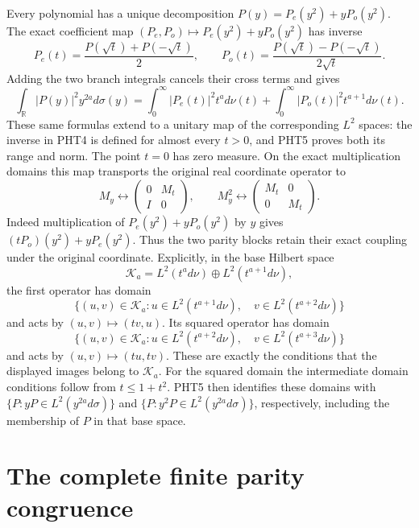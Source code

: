 \documentclass[11pt,a4paper]{article}
\begin{document}
Every polynomial has a unique decomposition
$P(y)=P_e(y^2)+yP_o(y^2)$. The exact coefficient map
$(P_e,P_o)\mapsto P_e(y^2)+yP_o(y^2)$ has inverse
\[
 P_e(t)=\frac{P(\sqrt t)+P(-\sqrt t)}2,
 \qquad
 P_o(t)=\frac{P(\sqrt t)-P(-\sqrt t)}{2\sqrt t}.
\tag{PHT4}
\]
Adding the two branch integrals cancels their cross terms and gives
\[
 \int_{\mathbb R}|P(y)|^2y^{2a}d\sigma(y)
 =\int_0^\infty|P_e(t)|^2t^a d\nu(t)
  +\int_0^\infty|P_o(t)|^2t^{a+1}d\nu(t).
\tag{PHT5}
\]
These same formulas extend to a unitary map of the corresponding
$L^2$ spaces: the inverse in PHT4 is defined for almost every
$t>0$, and PHT5 proves both its range and norm. The point $t=0$
has zero measure. On the exact multiplication domains this map
transports the original real coordinate operator to
\[
 M_y\longleftrightarrow
 \begin{pmatrix}0&M_t\\I&0\end{pmatrix},
 \qquad
 M_y^2\longleftrightarrow
 \begin{pmatrix}M_t&0\\0&M_t\end{pmatrix}.
\tag{PHT6}
\]
Indeed multiplication of $P_e(y^2)+yP_o(y^2)$ by $y$ gives
$(tP_o)(y^2)+yP_e(y^2)$. Thus the two parity blocks retain
their exact coupling under the original coordinate.
Explicitly, in the base Hilbert space
\[
 \mathcal K_a=L^2(t^a d\nu)\oplus L^2(t^{a+1}d\nu),
\]
the first operator has domain
\[
 \{(u,v)\in\mathcal K_a:
       u\in L^2(t^{a+1}d\nu),\quad
       v\in L^2(t^{a+2}d\nu)\}
\]
and acts by $(u,v)\mapsto(tv,u)$. Its squared operator has
domain
\[
 \{(u,v)\in\mathcal K_a:
       u\in L^2(t^{a+2}d\nu),\quad
       v\in L^2(t^{a+3}d\nu)\}
\]
and acts by $(u,v)\mapsto(tu,tv)$. These are exactly the
conditions that the displayed images belong to $\mathcal K_a$.
For the squared domain the intermediate domain conditions
follow from $t\leq1+t^2$. PHT5 then identifies these domains
with $\{P:yP\in L^2(y^{2a}d\sigma)\}$ and
$\{P:y^2P\in L^2(y^{2a}d\sigma)\}$, respectively, including
the membership of $P$ in that base space.

\section{The complete finite parity congruence}
\end{document}
